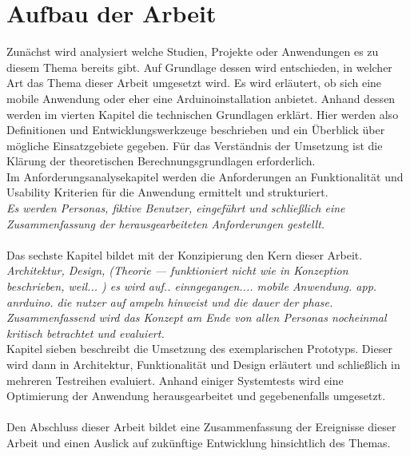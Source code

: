 \section{Aufbau der Arbeit}
Zunächst wird analysiert welche Studien, Projekte oder Anwendungen es zu diesem Thema bereits gibt. Auf Grundlage dessen wird entschieden, in welcher Art das Thema dieser Arbeit umgesetzt wird. Es wird erläutert, ob sich eine mobile Anwendung oder eher eine \gls{Arduino}installation anbietet. Anhand dessen werden im vierten Kapitel die technischen Grundlagen erklärt. Hier werden also Definitionen und Entwicklungswerkzeuge beschrieben und ein Überblick über mögliche Einsatzgebiete gegeben. Für das Verständnis der Umsetzung ist die Klärung der theoretischen Berechnungsgrundlagen erforderlich. \\
Im Anforderungsanalysekapitel werden die Anforderungen an Funktionalität und Usability Kriterien für die Anwendung ermittelt und strukturiert. \\
\textit{Es werden Personas, fiktive Benutzer, eingeführt und schließlich eine Zusammenfassung der herausgearbeiteten Anforderungen gestellt.}\\\\ 
Das sechste Kapitel bildet mit der Konzipierung den Kern dieser Arbeit. 
\textit{Architektur, Design, (Theorie --- funktioniert nicht wie in Konzeption beschrieben, weil... )
es wird auf.. einngegangen.... mobile Anwendung. app. anrduino. die nutzer auf ampeln hinweist und die dauer der phase. }
\textit{Zusammenfassend wird das Konzept am Ende von allen Personas nocheinmal kritisch betrachtet und evaluiert.}\\
Kapitel sieben beschreibt die Umsetzung des exemplarischen Prototyps. Dieser wird dann in Architektur, Funktionalität und Design erläutert und schließlich in mehreren Testreihen evaluiert. Anhand einiger Systemtests wird eine Optimierung der Anwendung herausgearbeitet und gegebenenfalls umgesetzt. 
\\\\Den Abschluss dieser Arbeit bildet eine Zusammenfassung der Ereignisse dieser Arbeit und einen Auslick auf zukünftige Entwicklung hinsichtlich des Themas.
